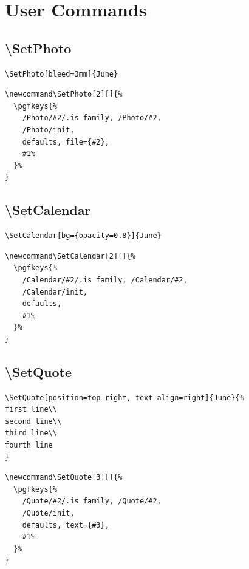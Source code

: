 \documentclass[11pt,oneside]{memoir-article}
\begin{document}
\chapter{User Commands}
\label{sec:org5ceabf3}
\section{\textbackslash SetPhoto}
\label{sec:org769e373}

\begin{verbatim}
\SetPhoto[bleed=3mm]{June}
\end{verbatim}


\begin{verbatim}
\newcommand\SetPhoto[2][]{%
  \pgfkeys{%
    /Photo/#2/.is family, /Photo/#2,
    /Photo/init,
    defaults, file={#2},
    #1%
  }%
}
\end{verbatim}

\section{\textbackslash SetCalendar}
\label{sec:org8a21952}

\begin{verbatim}
\SetCalendar[bg={opacity=0.8}]{June}
\end{verbatim}


\begin{verbatim}
\newcommand\SetCalendar[2][]{%
  \pgfkeys{%
    /Calendar/#2/.is family, /Calendar/#2,
    /Calendar/init,
    defaults,
    #1%
  }%
}
\end{verbatim}

\section{\textbackslash SetQuote}
\label{sec:org7a27978}

\begin{verbatim}
\SetQuote[position=top right, text align=right]{June}{%
first line\\
second line\\
third line\\
fourth line
}
\end{verbatim}


\begin{verbatim}
\newcommand\SetQuote[3][]{%
  \pgfkeys{%
    /Quote/#2/.is family, /Quote/#2,
    /Quote/init,
    defaults, text={#3},
    #1%
  }%
}
\end{verbatim}
\end{document}
